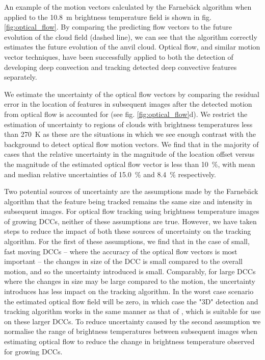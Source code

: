 \documentclass[amt, manuscript]{copernicus}
\begin{document}
An example of the motion vectors calculated by the Farnebäck algorithm when applied to the 10.8~\textmu m brightness temperature field is shown in fig. \ref{fig:optical_flow}.
By comparing the predicting flow vectors to the future evolution of the cloud field (dashed line), we can see that the algorithm correctly estimates the future evolution of the anvil cloud.
Optical flow, and similar motion vector techniques, have been successfully applied to both the detection of developing deep convection \citep{zinner_cb-tram:_2008, zhang_locating_2014} and tracking detected deep convective features \citep{senf_size-resolved_2018} separately.

We estimate the uncertainty of the optical flow vectors by comparing the residual error in the location of features in subsequent images after the detected motion from optical flow is accounted for (see fig. \ref{fig:optical_flow}d).
We restrict the estimation of uncertainty to regions of clouds with brightness temperatures less than 270~K as these are the situations in which we see enough contrast with the background to detect optical flow motion vectors.
We find that in the majority of cases that the relative uncertainty in the magnitude of the location offset versus the magnitude of the estimated optical flow vector is less than 10~\%, with mean and median relative uncertainties of 15.0~\% and 8.4~\% respectively.

Two potential sources of uncertainty are the assumptions made by the Farnebäck algorithm that the feature being tracked remains the same size and intensity in subsequent images.
For optical flow tracking using brightness temperature images of growing DCCs, neither of these assumptions are true.
However, we have taken steps to reduce the impact of both these sources of uncertainty on the tracking algorithm.
For the first of these assumptions, we find that in the case of small, fast moving DCCs -- where the accuracy of the optical flow vectors is most important -- the changes in size of the DCC is small compared to the overall motion, and so the uncertainty introduced is small.
Comparably, for large DCCs where the changes in size may be large compared to the motion, the uncertainty introduces has less impact on the tracking algorithm.
In the worst case scenario the estimated optical flow field will be zero, in which case the "3D" detection and tracking algorithm works in the same manner as that of \citet{fiolleau_algorithm_2013}, which is suitable for use on these larger DCCs.
To reduce uncertainty caused by the second assumption we normalise the range of brightness temperatures between subsequent images when estimating optical flow to reduce the change in brightness temperature observed for growing DCCs.
\end{document}
